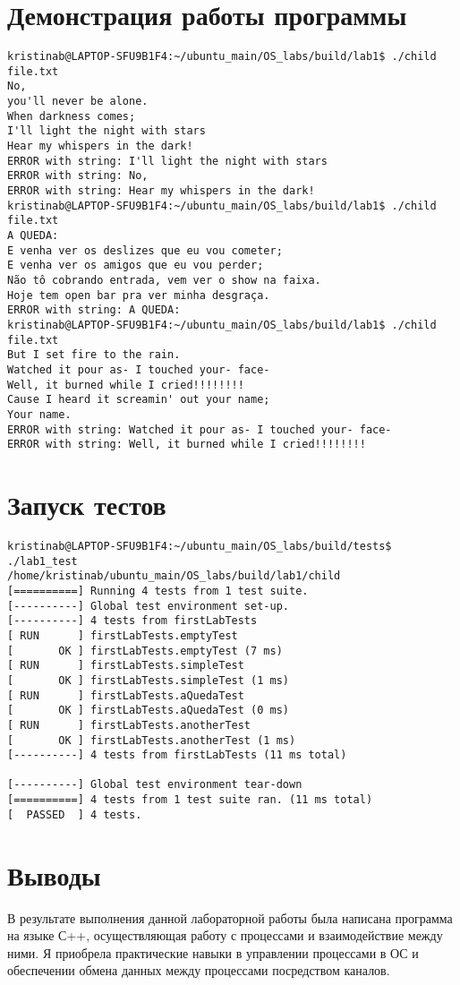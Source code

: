 \documentclass[a4paper, 12pt]{article}
\begin{document}
\newpage
\section{Демонстрация работы программы}

\begin{verbatim}
kristinab@LAPTOP-SFU9B1F4:~/ubuntu_main/OS_labs/build/lab1$ ./child file.txt
No,
you'll never be alone.
When darkness comes;
I'll light the night with stars
Hear my whispers in the dark!
ERROR with string: I'll light the night with stars
ERROR with string: No,
ERROR with string: Hear my whispers in the dark!
kristinab@LAPTOP-SFU9B1F4:~/ubuntu_main/OS_labs/build/lab1$ ./child file.txt
A QUEDA:
E venha ver os deslizes que eu vou cometer;
E venha ver os amigos que eu vou perder;
Não tô cobrando entrada, vem ver o show na faixa.
Hoje tem open bar pra ver minha desgraça.
ERROR with string: A QUEDA:
kristinab@LAPTOP-SFU9B1F4:~/ubuntu_main/OS_labs/build/lab1$ ./child file.txt
But I set fire to the rain.
Watched it pour as- I touched your- face-
Well, it burned while I cried!!!!!!!!
Cause I heard it screamin' out your name;
Your name.
ERROR with string: Watched it pour as- I touched your- face-
ERROR with string: Well, it burned while I cried!!!!!!!!
\end{verbatim}

\section{Запуск тестов}
\begin{verbatim}
kristinab@LAPTOP-SFU9B1F4:~/ubuntu_main/OS_labs/build/tests$ ./lab1_test
/home/kristinab/ubuntu_main/OS_labs/build/lab1/child
[==========] Running 4 tests from 1 test suite.
[----------] Global test environment set-up.
[----------] 4 tests from firstLabTests
[ RUN      ] firstLabTests.emptyTest
[       OK ] firstLabTests.emptyTest (7 ms)
[ RUN      ] firstLabTests.simpleTest
[       OK ] firstLabTests.simpleTest (1 ms)
[ RUN      ] firstLabTests.aQuedaTest
[       OK ] firstLabTests.aQuedaTest (0 ms)
[ RUN      ] firstLabTests.anotherTest
[       OK ] firstLabTests.anotherTest (1 ms)
[----------] 4 tests from firstLabTests (11 ms total)

[----------] Global test environment tear-down
[==========] 4 tests from 1 test suite ran. (11 ms total)
[  PASSED  ] 4 tests.
\end{verbatim}
\newpage
\section{Выводы}

В результате выполнения данной лабораторной работы была написана программа на языке С++, осуществляющая работу с процессами и 
взаимодействие между ними. Я приобрела практические навыки в управлении процессами в ОС и обеспечении обмена данных между процессами посредством каналов.
\end{document}
